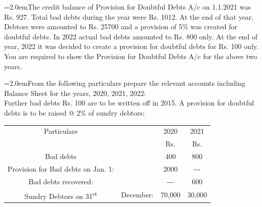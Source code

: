 \documentclass[11pt,a4paper]{article}
\newcommand{\lqn}[2]{\Needspace{6\baselineskip}\par\medskip\noindent\hangindent=2.0em\hangafter=1\makebox[2.0em][l]{\textbf{#1.}}#2\par}
\begin{document}
\lqn{95}{The credit balance of Provision for Doubtful Debts A/c on 1.1.2021 was Rs. 927. Total bad debts during the year were Rs. 1012. At the end of that year, Debtors were amounted to Rs. 25700 and a provision of 5\% was created for doubtful debts. In 2022 actual bad debts amounted to Rs. 800 only. At the end of year, 2022 it was decided to create a provision for doubtful debts for Rs. 100 only.\\
You are required to show the Provision for Doubtful Debts A/c for the above two years.\par
}
\lqn{96}{From the following particulars prepare the relevant accounts including Balance Sheet for the years, 2020, 2021, 2022:\\
Further bad debts Rs. 100 are to be written off in 2015. A provision for doubtful debts is to be raised @ 2\% of sundry debtors:\par
\par\smallskip\noindent\hspace*{1.2em}\begin{tabular}{|cccc|}
\hline
Particulars &  & 2020 & 2021 \\
 &  & Rs. & Rs. \\
Bad debts &  & 400 & 800 \\
Provision for Bad debts on Jan. 1: &  & 2000 & -{}-{}- \\
Bad debts recovered: &  & -{}-{}- & 600 \\
Sundry Debtors on 31\textsuperscript{st} & December: & 70,000 & 30,000 \\
\hline
\end{tabular}\par\smallskip
}
\end{document}
